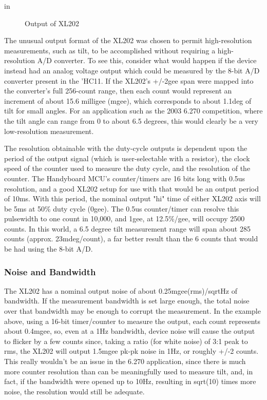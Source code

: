 \documentclass{article}
\begin{document}
 in
\begin{figure}[htbp]
\begin{center}
\caption{Output of XL202}
\label{outputwave}
\end{center}
\end{figure}

The unusual output format of the XL202 was chosen to permit
high-resolution measurements, such as tilt, to be accomplished without
requiring a high-resolution A/D converter.  To see this, consider what
would happen if the device instead had an analog voltage output which
could be measured by the 8-bit A/D converter present in the 'HC11.  If
the XL202's +/-2gee span were mapped into the converter's full
256-count range, then each count would represent an increment of about
15.6 milligee (mgee), which corresponds to about 1.1deg of tilt for
small angles.  For an application such as the 2003 6.270 competition,
where the tilt angle can range from 0 to about 6.5 degrees, this would
clearly be a very low-resolution measurement.

The resolution obtainable with the duty-cycle outputs is dependent
upon the period of the output signal (which is user-selectable with a
resistor), the clock speed of the counter used to measure the duty
cycle, and the resolution of the counter. The Handyboard MCU's
counter/timers are 16 bits long with 0.5us resolution, and a good
XL202 setup for use with that would be an output period of 10ms.  With
this period, the nominal output "hi" time of either XL202 axis will be
5ms at 50\% duty cycle (0gee).  The 0.5us counter/timer can resolve
this pulsewidth to one
count in 10,000, and 1gee, at 12.5\%/gee, will occupy 2500 counts.  In
this world, a 6.5 degree tilt measurement range will span about 285
counts (approx. 23mdeg/count), a far better result than the 6 counts
that would be had using the 8-bit A/D.

\subsubsection{Noise and Bandwidth}

The XL202 has a nominal output noise of about 0.25mgee(rms)/sqrtHz of
bandwidth.  If the measurement bandwidth is set large enough, the
total noise over that bandwidth may be enough to corrupt the
measurement.  In the example above, using a 16-bit timer/counter to
measure the output, each count represents about 0.4mgee, so, even at a
1Hz bandwidth, device noise will cause the output to flicker by a few
counts since, taking a ratio (for white noise) of 3:1 peak to rms, the
XL202 will output 1.5mgee pk-pk noise in 1Hz, or roughly +/-2 counts.
This really wouldn't be an issue in the 6.270 application, since there
is much more counter resolution than can be meaningfully used to
measure tilt, and, in fact, if the bandwidth were opened up to 10Hz,
resulting in sqrt(10) times more noise, the resolution would still be
adequate.
\end{document}
